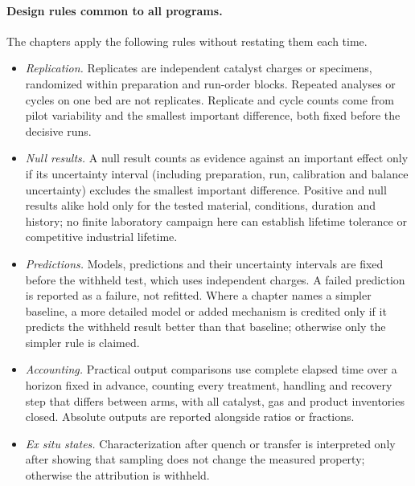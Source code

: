 \paragraph{Design rules common to all programs.}
The chapters apply the following rules without restating them each time.
\begin{itemize}
 \item \emph{Replication.} Replicates are independent catalyst charges or specimens, randomized within preparation and run-order blocks. Repeated analyses or cycles on one bed are not replicates. Replicate and cycle counts come from pilot variability and the smallest important difference, both fixed before the decisive runs.
 \item \emph{Null results.} A null result counts as evidence against an important effect only if its uncertainty interval (including preparation, run, calibration and balance uncertainty) excludes the smallest important difference. Positive and null results alike hold only for the tested material, conditions, duration and history; no finite laboratory campaign here can establish lifetime tolerance or competitive industrial lifetime.
 \item \emph{Predictions.} Models, predictions and their uncertainty intervals are fixed before the withheld test, which uses independent charges. A failed prediction is reported as a failure, not refitted. Where a chapter names a simpler baseline, a more detailed model or added mechanism is credited only if it predicts the withheld result better than that baseline; otherwise only the simpler rule is claimed.
 \item \emph{Accounting.} Practical output comparisons use complete elapsed time over a horizon fixed in advance, counting every treatment, handling and recovery step that differs between arms, with all catalyst, gas and product inventories closed. Absolute outputs are reported alongside ratios or fractions.
 \item \emph{Ex situ states.} Characterization after quench or transfer is interpreted only after showing that sampling does not change the measured property; otherwise the attribution is withheld.
\end{itemize}
